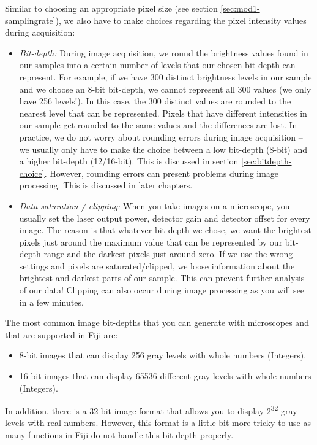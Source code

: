 Similar to choosing an appropriate pixel size (see section \ref{sec:mod1-samplingrate}), we also have to make choices regarding the pixel intensity values during acquisition:
\begin{itemize}
	\item \emph{Bit-depth:} During image acquisition, we round the brightness values found in our samples into a certain number of levels that our chosen bit-depth can represent. For example, if we have 300 distinct brightness levels in our sample and we choose an 8-bit bit-depth, we cannot represent all 300 values (we only have 256 levels!). In this case, the 300 distinct values are rounded to the nearest level that can be represented. Pixels that have different intensities in our sample get rounded to the same values and the differences are lost. In practice, we do not worry about rounding errors during image acquisition -- we usually only have to make the choice between a low bit-depth (8-bit) and a higher bit-depth (12/16-bit). This is discussed in section \ref{sec:bitdepth-choice}. However, rounding errors can present problems during image processing. This is discussed in later chapters.
	\item \emph{Data saturation / clipping: } When you take images on a microscope, you usually set the laser output power, detector gain and detector offset for every image. The reason is that whatever bit-depth we chose, we want the brightest pixels just around the maximum value that can be represented by our bit-depth range and the darkest pixels just around zero. If we use the wrong settings and pixels are saturated/clipped, we loose information about the brightest and darkest parts of our sample. This can prevent further analysis of our data! Clipping can also occur during image processing as you will see in a few minutes.
\end{itemize}

The most common image bit-depths that you can generate with microscopes and that are supported in Fiji are:
\begin{itemize}
	\item 8-bit images that can display 256 gray levels with whole numbers (Integers).
	\item 16-bit images that can display 65536 different gray levels with whole numbers (Integers).
\end{itemize}

In addition, there is a 32-bit image format that allows you to display 2\textsuperscript{32} gray levels with real numbers. However, this format is a little bit more tricky to use as many functions in Fiji do not handle this bit-depth properly.

